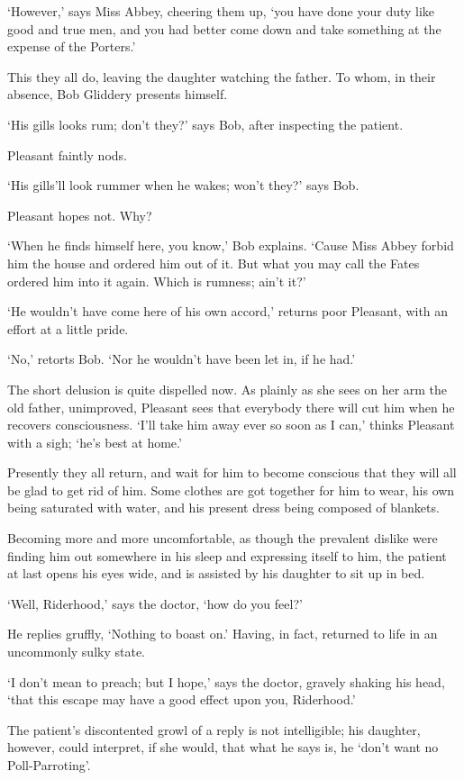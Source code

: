 ‘However,’ says Miss Abbey, cheering them up, ‘you have done your duty
like good and true men, and you had better come down and take something
at the expense of the Porters.’

This they all do, leaving the daughter watching the father. To whom, in
their absence, Bob Gliddery presents himself.

‘His gills looks rum; don’t they?’ says Bob, after inspecting the
patient.

Pleasant faintly nods.

‘His gills’ll look rummer when he wakes; won’t they?’ says Bob.

Pleasant hopes not. Why?

‘When he finds himself here, you know,’ Bob explains. ‘Cause Miss Abbey
forbid him the house and ordered him out of it. But what you may call
the Fates ordered him into it again. Which is rumness; ain’t it?’

‘He wouldn’t have come here of his own accord,’ returns poor Pleasant,
with an effort at a little pride.

‘No,’ retorts Bob. ‘Nor he wouldn’t have been let in, if he had.’

The short delusion is quite dispelled now. As plainly as she sees on her
arm the old father, unimproved, Pleasant sees that everybody there will
cut him when he recovers consciousness. ‘I’ll take him away ever so soon
as I can,’ thinks Pleasant with a sigh; ‘he’s best at home.’

Presently they all return, and wait for him to become conscious that
they will all be glad to get rid of him. Some clothes are got together
for him to wear, his own being saturated with water, and his present
dress being composed of blankets.

Becoming more and more uncomfortable, as though the prevalent dislike
were finding him out somewhere in his sleep and expressing itself to
him, the patient at last opens his eyes wide, and is assisted by his
daughter to sit up in bed.

‘Well, Riderhood,’ says the doctor, ‘how do you feel?’

He replies gruffly, ‘Nothing to boast on.’ Having, in fact, returned to
life in an uncommonly sulky state.

‘I don’t mean to preach; but I hope,’ says the doctor, gravely shaking
his head, ‘that this escape may have a good effect upon you, Riderhood.’

The patient’s discontented growl of a reply is not intelligible; his
daughter, however, could interpret, if she would, that what he says is,
he ‘don’t want no Poll-Parroting’.

